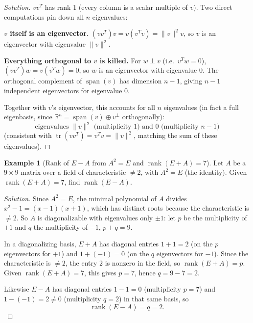 \documentclass[11pt]{article}
\theoremstyle{definition}
\newtheorem{example}{Example}[section]
\newcommand{\R}{\mathbb{R}}
\newcommand{\rank}{\operatorname{rank}}
\newcommand{\Span}{\operatorname{span}}
\newcommand{\trace}{\operatorname{tr}}
\begin{document}
\begin{proof}[Solution]
$vv^T$ has rank $1$ (every column is a scalar multiple of $v$). Two direct computations pin down all $n$ eigenvalues:

\textbf{$v$ itself is an eigenvector.} $(vv^T)v=v(v^Tv)=\|v\|^2v$, so $v$ is an eigenvector with eigenvalue $\|v\|^2$.

\textbf{Everything orthogonal to $v$ is killed.} For $w\perp v$ (i.e.\ $v^Tw=0$), $(vv^T)w=v(v^Tw)=0$, so $w$ is an eigenvector with eigenvalue $0$. The orthogonal complement of $\Span(v)$ has dimension $n-1$, giving $n-1$ independent eigenvectors for eigenvalue $0$.

Together with $v$'s eigenvector, this accounts for all $n$ eigenvalues (in fact a full eigenbasis, since $\R^n=\Span(v)\oplus v^\perp$ orthogonally):
\[
\boxed{\text{eigenvalues } \|v\|^2 \text{ (multiplicity } 1\text{) and } 0 \text{ (multiplicity } n-1\text{)}}
\]
(consistent with $\trace(vv^T)=v^Tv=\|v\|^2$, matching the sum of these eigenvalues).
\end{proof}

\begin{example}[Rank of $E-A$ from $A^2=E$ and $\rank(E+A)=7$]
Let $A$ be a $9\times9$ matrix over a field of characteristic $\ne2$, with $A^2=E$ (the identity). Given $\rank(E+A)=7$, find $\rank(E-A)$.
\end{example}
\begin{proof}[Solution]
Since $A^2=E$, the minimal polynomial of $A$ divides $x^2-1=(x-1)(x+1)$, which has distinct roots because the characteristic is $\ne2$. So $A$ is diagonalizable with eigenvalues only $\pm1$: let $p$ be the multiplicity of $+1$ and $q$ the multiplicity of $-1$, $p+q=9$.

In a diagonalizing basis, $E+A$ has diagonal entries $1+1=2$ (on the $p$ eigenvectors for $+1$) and $1+(-1)=0$ (on the $q$ eigenvectors for $-1$). Since the characteristic is $\ne2$, the entry $2$ is nonzero in the field, so $\rank(E+A)=p$. Given $\rank(E+A)=7$, this gives $p=7$, hence $q=9-7=2$.

Likewise $E-A$ has diagonal entries $1-1=0$ (multiplicity $p=7$) and $1-(-1)=2\ne0$ (multiplicity $q=2$) in that same basis, so
\[
\boxed{\rank(E-A)=q=2}.
\]
\end{proof}
\end{document}
